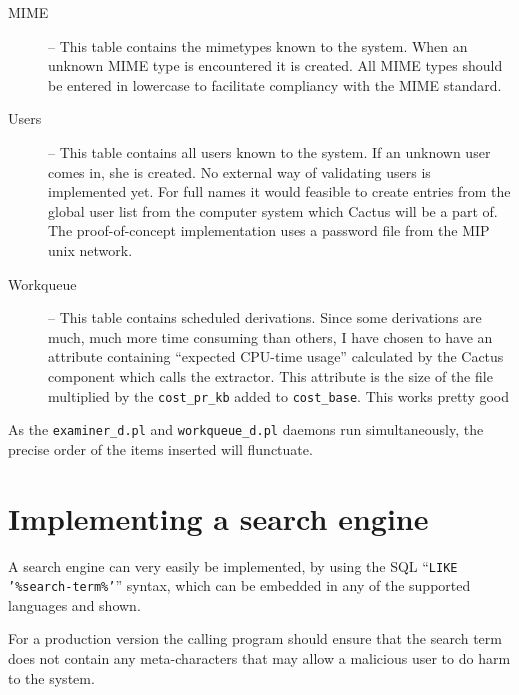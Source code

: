 \begin{description}


\item[MIME] -- This table contains the mimetypes known to the system.
  When an unknown MIME type is encountered it is created.  All MIME
  types should be entered in lowercase to facilitate compliancy with
  the MIME standard.



\item[Users] -- This table contains all users known to the system.  If
  an unknown user comes in, she is created.  No external way of
  validating users is implemented yet.  For full names it would
  feasible to create entries from the global user list from the
  computer system which Cactus will be a part of.  The
  proof-of-concept implementation uses a password file from the MIP
  unix network.



\item[Workqueue] -- This table 
contains scheduled derivations.  Since some derivations are much, much
more time consuming than others, I have chosen to have an attribute
containing ``expected CPU-time usage'' calculated by the Cactus
component which calls the extractor.  This attribute is the
size of the file multiplied by the \texttt{cost\_pr\_kb} added to
\texttt{cost\_base}. This works pretty good
  


\end{description}

As the \texttt{examiner\_d.pl} and \texttt{workqueue\_d.pl} daemons
run simultaneously, the precise order of the items inserted will
flunctuate.


\section{Implementing a search engine}

A search engine can very easily be implemented, by using the SQL
``\texttt{LIKE '\%search-term\%'}'' syntax, which can be embedded in
any of the supported languages and shown.


For a production version the calling program should ensure that the
search term does not contain any meta-characters that may allow a
malicious user to do harm to the system.


